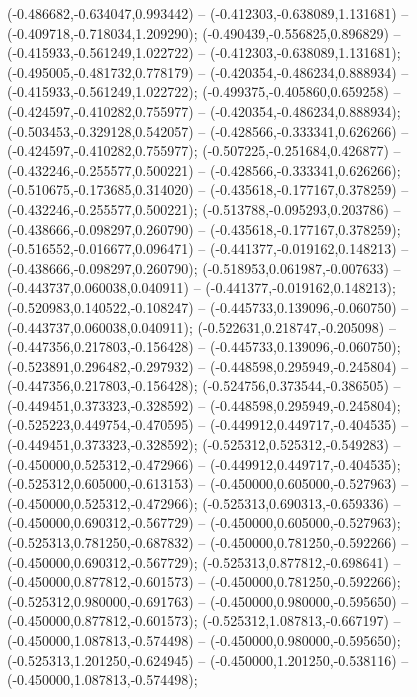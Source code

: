  (-0.486682,-0.634047,0.993442) -- (-0.412303,-0.638089,1.131681) -- (-0.409718,-0.718034,1.209290);
 (-0.490439,-0.556825,0.896829) -- (-0.415933,-0.561249,1.022722) -- (-0.412303,-0.638089,1.131681);
 (-0.495005,-0.481732,0.778179) -- (-0.420354,-0.486234,0.888934) -- (-0.415933,-0.561249,1.022722);
 (-0.499375,-0.405860,0.659258) -- (-0.424597,-0.410282,0.755977) -- (-0.420354,-0.486234,0.888934);
 (-0.503453,-0.329128,0.542057) -- (-0.428566,-0.333341,0.626266) -- (-0.424597,-0.410282,0.755977);
 (-0.507225,-0.251684,0.426877) -- (-0.432246,-0.255577,0.500221) -- (-0.428566,-0.333341,0.626266);
 (-0.510675,-0.173685,0.314020) -- (-0.435618,-0.177167,0.378259) -- (-0.432246,-0.255577,0.500221);
 (-0.513788,-0.095293,0.203786) -- (-0.438666,-0.098297,0.260790) -- (-0.435618,-0.177167,0.378259);
 (-0.516552,-0.016677,0.096471) -- (-0.441377,-0.019162,0.148213) -- (-0.438666,-0.098297,0.260790);
 (-0.518953,0.061987,-0.007633) -- (-0.443737,0.060038,0.040911) -- (-0.441377,-0.019162,0.148213);
 (-0.520983,0.140522,-0.108247) -- (-0.445733,0.139096,-0.060750) -- (-0.443737,0.060038,0.040911);
 (-0.522631,0.218747,-0.205098) -- (-0.447356,0.217803,-0.156428) -- (-0.445733,0.139096,-0.060750);
 (-0.523891,0.296482,-0.297932) -- (-0.448598,0.295949,-0.245804) -- (-0.447356,0.217803,-0.156428);
 (-0.524756,0.373544,-0.386505) -- (-0.449451,0.373323,-0.328592) -- (-0.448598,0.295949,-0.245804);
 (-0.525223,0.449754,-0.470595) -- (-0.449912,0.449717,-0.404535) -- (-0.449451,0.373323,-0.328592);
 (-0.525312,0.525312,-0.549283) -- (-0.450000,0.525312,-0.472966) -- (-0.449912,0.449717,-0.404535);
 (-0.525312,0.605000,-0.613153) -- (-0.450000,0.605000,-0.527963) -- (-0.450000,0.525312,-0.472966);
 (-0.525313,0.690313,-0.659336) -- (-0.450000,0.690312,-0.567729) -- (-0.450000,0.605000,-0.527963);
 (-0.525313,0.781250,-0.687832) -- (-0.450000,0.781250,-0.592266) -- (-0.450000,0.690312,-0.567729);
 (-0.525313,0.877812,-0.698641) -- (-0.450000,0.877812,-0.601573) -- (-0.450000,0.781250,-0.592266);
 (-0.525312,0.980000,-0.691763) -- (-0.450000,0.980000,-0.595650) -- (-0.450000,0.877812,-0.601573);
 (-0.525312,1.087813,-0.667197) -- (-0.450000,1.087813,-0.574498) -- (-0.450000,0.980000,-0.595650);
 (-0.525313,1.201250,-0.624945) -- (-0.450000,1.201250,-0.538116) -- (-0.450000,1.087813,-0.574498);
